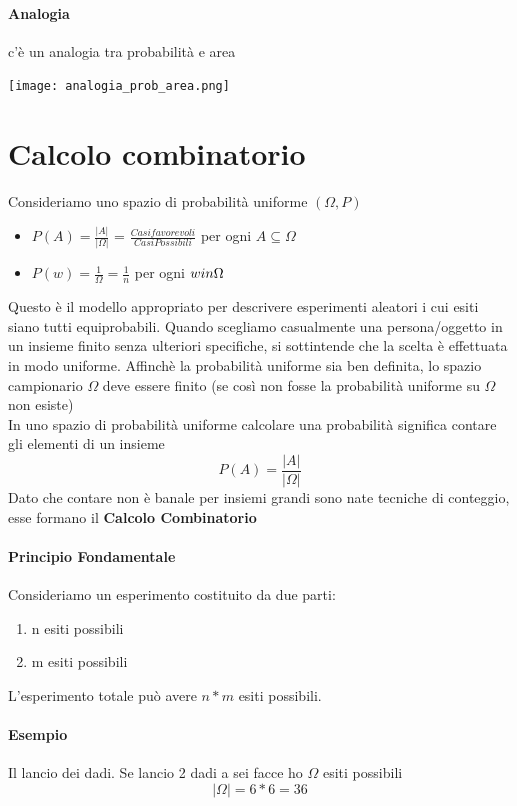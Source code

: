 \documentclass[12pt, a4paper, openany]{book}
\begin{document}
\paragraph{Analogia} c'è un analogia tra probabilità e area
\begin{center}
    \texttt{[image: analogia\_prob\_area.png]}
\end{center}

\section{Calcolo combinatorio}
Consideriamo uno spazio di probabilità uniforme $(\Omega, P)$
\begin{itemize}
    \item $P(A) = \frac{|A|}{|\Omega|}$ = $\frac{Casi favorevoli}{Casi Possibili}$
    per ogni $A \subseteq \Omega$
    \item $P({w}) = \frac{1}{\Omega} = \frac{1}{n}$ per ogni $w \\in \Omega$
\end{itemize}
Questo è il modello appropriato per descrivere esperimenti aleatori i cui esiti
siano tutti equiprobabili. Quando scegliamo casualmente una persona/oggetto in un 
insieme finito senza ulteriori specifiche, si sottintende che la scelta è effettuata
in modo uniforme.
Affinchè la probabilità uniforme sia ben definita, lo spazio campionario $\Omega$
deve essere finito (se così non fosse la probabilità uniforme su $\Omega$ non esiste)
\\ In uno spazio di probabilità uniforme calcolare una probabilità significa contare gli 
elementi di un insieme
\begin{equation}
    P(A) = \frac{|A|}{|\Omega|}
\end{equation}
Dato che contare non è banale per insiemi grandi sono nate tecniche di conteggio,
esse formano il \textbf{Calcolo Combinatorio}
\paragraph{Principio Fondamentale} Consideriamo un esperimento costituito da due parti:
\begin{enumerate}
    \item n esiti possibili
    \item m esiti possibili
\end{enumerate}
L'esperimento totale può avere $n*m$ esiti possibili.
\paragraph{Esempio} Il lancio dei dadi. Se lancio 2 dadi a sei facce ho $\Omega$ 
esiti possibili
\begin{equation}
    |\Omega| = 6*6 = 36
\end{equation}
\end{document}
